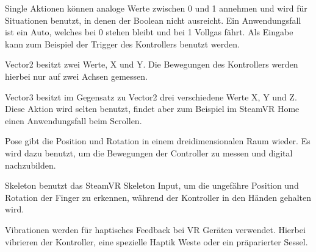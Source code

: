 \begin{itemize}
Single Aktionen können analoge Werte zwischen 0 und 1 annehmen und wird für Situationen benutzt, in denen der Boolean nicht ausreicht.
Ein Anwendungsfall ist ein Auto, welches bei 0 stehen bleibt und bei 1 Vollgas fährt.
Als Eingabe kann zum Beispiel der Trigger des Kontrollers benutzt werden.

Vector2 besitzt zwei Werte, X und Y.
Die Bewegungen des Kontrollers werden hierbei nur auf zwei Achsen gemessen.

Vector3 besitzt im Gegensatz zu Vector2 drei verschiedene Werte X, Y und Z.
Diese Aktion wird selten benutzt, findet aber zum Beispiel im SteamVR Home einen Anwendungsfall beim Scrollen.

Pose gibt die Position und Rotation in einem dreidimensionalen Raum wieder.
Es wird dazu benutzt, um die Bewegungen der Controller zu messen und digital nachzubilden.

Skeleton benutzt das SteamVR Skeleton Input, um die ungefähre Position und Rotation der Finger zu erkennen, während der Kontroller in den Händen gehalten wird.

Vibrationen werden für haptisches Feedback bei VR Geräten verwendet.
Hierbei vibrieren der Kontroller, eine spezielle Haptik Weste oder ein präparierter Sessel.
~\cite{SteamVR_Input_2022}


\end{itemize}
